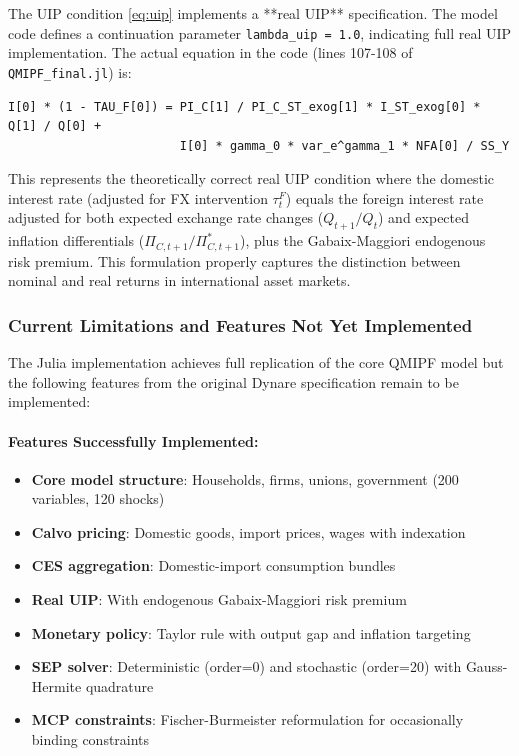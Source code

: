 \documentclass[12pt]{article}
\begin{document}
The UIP condition \eqref{eq:uip} implements a **real UIP** specification. The model code defines a continuation parameter \texttt{lambda\_uip = 1.0}, indicating full real UIP implementation. The actual equation in the code (lines 107-108 of \texttt{QMIPF\_final.jl}) is:
\begin{verbatim}
I[0] * (1 - TAU_F[0]) = PI_C[1] / PI_C_ST_exog[1] * I_ST_exog[0] * Q[1] / Q[0] +
                        I[0] * gamma_0 * var_e^gamma_1 * NFA[0] / SS_Y
\end{verbatim}
This represents the theoretically correct real UIP condition where the domestic interest rate (adjusted for FX intervention $\tau_t^F$) equals the foreign interest rate adjusted for both expected exchange rate changes ($Q_{t+1}/Q_t$) and expected inflation differentials ($\Pi_{C,t+1}/\Pi_{C,t+1}^*$), plus the Gabaix-Maggiori endogenous risk premium. This formulation properly captures the distinction between nominal and real returns in international asset markets.

\subsubsection{Current Limitations and Features Not Yet Implemented}

The Julia implementation achieves full replication of the core QMIPF model but the following features from the original Dynare specification remain to be implemented:

\paragraph{Features Successfully Implemented:}
\begin{itemize}
\item \textbf{Core model structure}: Households, firms, unions, government (200 variables, 120 shocks)
\item \textbf{Calvo pricing}: Domestic goods, import prices, wages with indexation
\item \textbf{CES aggregation}: Domestic-import consumption bundles
\item \textbf{Real UIP}: With endogenous Gabaix-Maggiori risk premium
\item \textbf{Monetary policy}: Taylor rule with output gap and inflation targeting
\item \textbf{SEP solver}: Deterministic (order=0) and stochastic (order=20) with Gauss-Hermite quadrature
\item \textbf{MCP constraints}: Fischer-Burmeister reformulation for occasionally binding constraints
\end{itemize}
\end{document}
